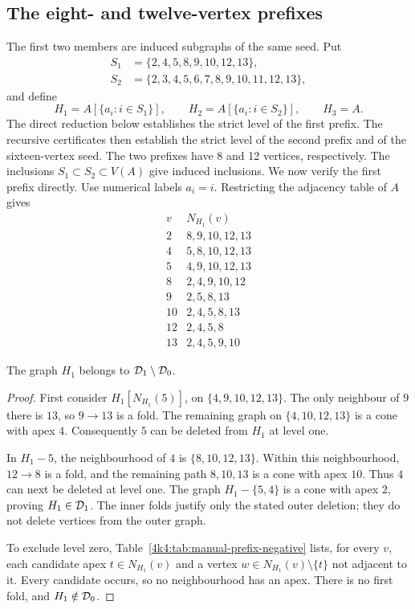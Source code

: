 \subsection{The eight- and twelve-vertex prefixes}
The first two members are induced subgraphs of the same seed. Put
\[
\begin{aligned}
S_1&=\{2,4,5,8,9,10,12,13\},\\
S_2&=\{2,3,4,5,6,7,8,9,10,11,12,13\},
\end{aligned}
\]
and define
\[
H_1=A[\{a_i:i\in S_1\}],\qquad
H_2=A[\{a_i:i\in S_2\}],\qquad H_3=A.
\]
The direct reduction below establishes the strict level of the first prefix.
The recursive certificates then establish the strict level of the second
prefix and of the sixteen-vertex seed.
The two prefixes have 8 and 12 vertices, respectively.
The inclusions \(S_1\subset S_2\subset V(A)\) give induced inclusions.
We now verify the first prefix directly. Use numerical labels \(a_i=i\). Restricting the adjacency
table of \(A\) gives
\[
\begin{array}{c|l}
v&N_{H_1}(v)\\\hline
2&8,9,10,12,13\\
4&5,8,10,12,13\\
5&4,9,10,12,13\\
8&2,4,9,10,12\\
9&2,5,8,13\\
10&2,4,5,8,13\\
12&2,4,5,8\\
13&2,4,5,9,10
\end{array}
\]
\begin{proposition}\label{4k4:prop:manual-prefix}
The graph \(H_1\) belongs to \(\mathcal D_1\setminus\mathcal D_0\).
\end{proposition}
\begin{proof}
First consider \(H_1[N_{H_1}(5)]\), on \(\{4,9,10,12,13\}\).
The only neighbour of \(9\) there is \(13\), so \(9\to13\)
is a fold. The remaining graph on \(\{4,10,12,13\}\) is a cone
with apex \(4\). Consequently \(5\) can be deleted from \(H_1\)
at level one.

In \(H_1-5\), the neighbourhood of \(4\) is
\(\{8,10,12,13\}\). Within this neighbourhood, \(12\to8\)
is a fold, and the remaining path \(8,10,13\) is a cone with
apex \(10\). Thus \(4\) can next be deleted at level one.
The graph \(H_1-\{5,4\}\) is a cone with apex \(2\), proving
\(H_1\in\mathcal D_1\). The inner folds justify only the stated outer
deletion; they do not delete vertices from the outer graph.

To exclude level zero, Table~\ref{4k4:tab:manual-prefix-negative}
lists, for every \(v\), each candidate apex \(t\in N_{H_1}(v)\)
and a vertex \(w\in N_{H_1}(v)\setminus\{t\}\) not adjacent to it.
Every candidate occurs, so no neighbourhood has an apex.
There is no first fold, and \(H_1\notin\mathcal D_0\).
\end{proof}

